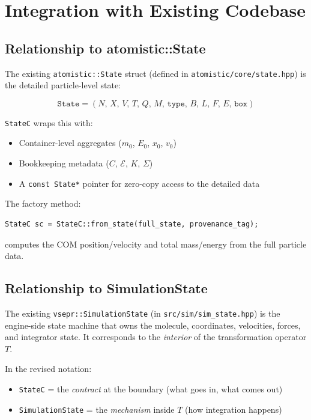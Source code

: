 \documentclass[11pt]{article}
\begin{document}
\section{Integration with Existing Codebase}

\subsection{Relationship to atomistic::State}

The existing \texttt{atomistic::State} struct (defined in \texttt{atomistic/core/state.hpp}) is the detailed particle-level state:

\begin{equation}
\texttt{State} = (N, \, X, \, V, \, T, \, Q, \, M, \, \texttt{type}, \, B, \, L, \, F, \, E, \, \texttt{box})
\end{equation}

\texttt{StateC} wraps this with:
\begin{itemize}
  \item Container-level aggregates ($m_0$, $E_0$, $x_0$, $v_0$)
  \item Bookkeeping metadata ($C$, $\mathcal{E}$, $K$, $\Sigma$)
  \item A \texttt{const State*} pointer for zero-copy access to the detailed data
\end{itemize}

The factory method:
\begin{lstlisting}
StateC sc = StateC::from_state(full_state, provenance_tag);
\end{lstlisting}

computes the COM position/velocity and total mass/energy from the full particle data.

\subsection{Relationship to SimulationState}

The existing \texttt{vsepr::SimulationState} (in \texttt{src/sim/sim\_state.hpp}) is the engine-side state machine that owns the molecule, coordinates, velocities, forces, and integrator state. It corresponds to the \textit{interior} of the transformation operator $T$.

In the revised notation:
\begin{itemize}
  \item \texttt{StateC} = the \textit{contract} at the boundary (what goes in, what comes out)
  \item \texttt{SimulationState} = the \textit{mechanism} inside $T$ (how integration happens)
\end{itemize}
\end{document}
